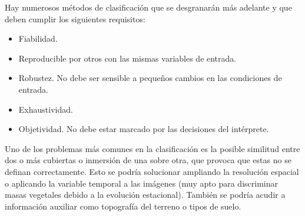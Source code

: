 Hay numerosos métodos de clasificación que se desgranarán más adelante y que deben cumplir los siguientes requisitos:

\begin{itemize}
	\item Fiabilidad.
	\item Reproducible por otros con las mismas variables de entrada.
	\item Robustez. No debe ser sensible a pequeños cambios en las condiciones de entrada.
	\item Exhaustividad.
	\item Objetividad. No debe estar marcado por las decisiones del intérprete.
\end{itemize}

Uno de los problemas más comunes en la clasificación es la posible similitud entre dos o más cubiertas o inmersión de una sobre otra, que provoca que estas no se definan correctamente. Esto se podría solucionar ampliando la resolución espacial o aplicando la variable temporal a las imágenes (muy apto para discriminar masas vegetales debido a la evolución estacional). También se podría acudir a información auxiliar como topografía del terreno o tipos de suelo.

